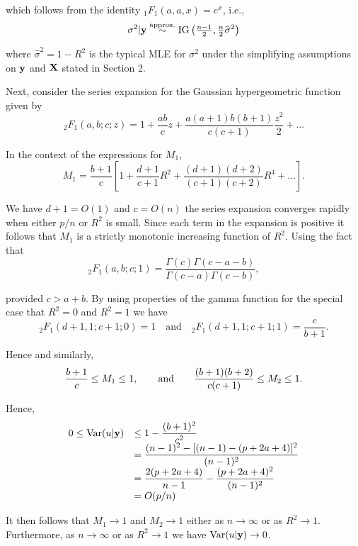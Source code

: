 \documentclass{article}[12pt]
\begin{document}
\noindent which follows from the identity ${}_1 F_1(a,a,x) = e^x$, i.e.,
\begin{equation}\label{eq:sigma2givenYapprox}
\displaystyle \sigma^2|{\bf y} \stackrel{\mbox{\scriptsize approx.}}{\sim} \mbox{IG}\left( \tfrac{n-1}{2}, \tfrac{n}{2}\widehat{\sigma}^2 \right)
\end{equation}

\noindent where $\widehat{\sigma}^2 = 1 - R^2$ is the typical MLE for $\sigma^2$ under the 
simplifying assumptions on ${\bf y}$ and ${\bf X}$ stated in Section 2. 

Next, consider the series expansion for the Gaussian hypergeometric function 
given by
$$
{}_2 F_1 (a, b; c; z)        
= 1 + \frac{ab}{c} z + \frac{a(a + 1)b(b+1)}{c(c+1)} \frac{z^2}{2} + \ldots
$$

\noindent In the context of the expressions for $M_1$,
$$
M_1 = \frac{b + 1}{c}
\left[ 
1 + \frac{d+1}{c+1} R^2 + \frac{ (d+1)(d + 2) }{(c+1)(c+2)} R^4 + \ldots
\right].  
$$

\noindent 
We have $d+1 = O(1)$ and $c = O(n)$ the series expansion converges rapidly when either 
$p/n$ or $R^2$ is small. Since each term in the expansion is positive it follows
that $M_1$ is a
strictly monotonic increasing function of $R^2$. Using the fact that 
$$
{}_2F_1 (a,b;c;1)= \frac{\Gamma(c)\Gamma(c-a-b)}{\Gamma(c-a)\Gamma(c-b)}, \qquad   
$$

\noindent provided $c>a+b$. By using properties of the gamma function
 for the special case that $R^2 = 0$ and 
$R^2=1$ we have
$$
{}_2 F_1 (d + 1, 1; c + 1; 0) = 1 \quad \mbox{and} \quad  
{}_2 F_1 (d + 1, 1; c + 1; 1) = \frac{c}{b + 1}.
$$

\noindent Hence and similarly,
$$
\displaystyle \frac{b + 1}{c} \le M_1 \le 1, \qquad \mbox{and} \qquad \frac{(b+1)(b+2)}{c(c+1)} \le M_2 \le 1.
$$

\noindent Hence,
$$
\begin{array}{rl}
0 \le \mbox{Var}(u|{\bf y}) 
& \displaystyle \le 1 - \frac{(b+1)^2}{c^2}
\\
& \displaystyle = \frac{(n - 1)^2 - [(n - 1) - (p  + 2a + 4)]^2}{(n - 1)^2}
\\
& \displaystyle 
= \frac{2(p  + 2a + 4)}{n - 1} - \frac{(p  + 2a + 4)^2}{(n - 1)^2}
\\
& \displaystyle = O(p/n)
\end{array} 
$$

\noindent It then follows that $M_1 \to 1$ and $M_2\to 1$ either
as $n\to \infty$ or as $R^2 \to 1$. Furthermore, as $n\to \infty$ or as $R^2 \to 1$ 
we have $\mbox{Var}(u|{\bf y}) \to 0$.
\end{document}
